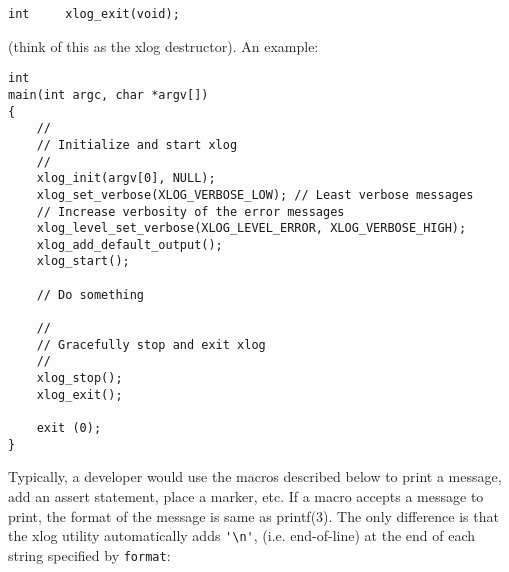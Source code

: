 \documentclass[11pt]{article}
\begin{document}
\begin{itemize}
\begin{verbatim}
int     xlog_exit(void);
\end{verbatim}
	
	(think of this as the xlog destructor).
	An example:

\begin{verbatim}
int
main(int argc, char *argv[])
{
    //
    // Initialize and start xlog
    //
    xlog_init(argv[0], NULL);
    xlog_set_verbose(XLOG_VERBOSE_LOW);	// Least verbose messages
    // Increase verbosity of the error messages
    xlog_level_set_verbose(XLOG_LEVEL_ERROR, XLOG_VERBOSE_HIGH);
    xlog_add_default_output();
    xlog_start();

    // Do something

    //
    // Gracefully stop and exit xlog
    //
    xlog_stop();
    xlog_exit();

    exit (0);
}
\end{verbatim}

\end{itemize}


Typically, a developer would use the macros described below
to print a message, add an assert statement, place a marker, etc.
If a macro accepts a message to print, the format of the message is same
as printf(3). The only difference is that the xlog utility automatically
adds \verb='\n'=, (i.e. end-of-line) at the end of each string
specified by \verb=format=:
\end{document}

